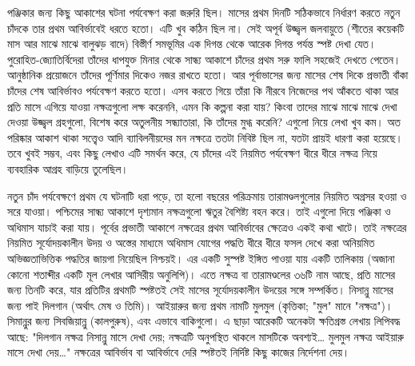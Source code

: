 পঞ্জিকার জন্য কিছু আকাশের ঘটনা পর্যবেক্ষণ করা জরুরি ছিল। মাসের প্রথম দিনটি সঠিকভাবে নির্ধারণ করতে নতুন চাঁদকে তার প্রথম আবির্ভাবেই ধরতে হতো। এটি খুব কঠিন ছিল না। সেই অপূর্ব উজ্জ্বল জলবায়ুতে (শীতের কয়েকটি মাস আর মাঝে মাঝে বালুঝড় বাদে) বিস্তীর্ণ সমভূমির এক দিগন্ত থেকে আরেক দিগন্ত পর্যন্ত স্পষ্ট দেখা যেত। পুরোহিত-জ্যোতির্বিদেরা তাঁদের ধাপযুক্ত মিনার থেকে সান্ধ্য আকাশে চাঁদের প্রথম সরু ফালি সহজেই দেখতে পেতেন। আনুষ্ঠানিক প্রয়োজনে তাঁদের পূর্ণিমার দিকেও নজর রাখতে হতো। আর পূর্বাভাসের জন্য মাসের শেষ দিকে প্রভাতী বাঁকা চাঁদের শেষ আবির্ভাবও পর্যবেক্ষণ করতে হতো। এসব করতে গিয়ে তাঁরা কি নীরবে নিজেদের পথ আঁকতে থাকা আর প্রতি মাসে এগিয়ে যাওয়া নক্ষত্রগুলো লক্ষ করেননি, এমন কি কল্পনা করা যায়? কিংবা তাদের মাঝে মাঝে মাঝে দেখা দেওয়া উজ্জ্বল গ্রহগুলো, বিশেষ করে অতুলনীয় সন্ধ্যাতারা, কি তাঁদের মুগ্ধ করেনি? এগুলো নিয়ে লেখা খুব কম। অত পরিষ্কার আকাশ থাকা সত্ত্বেও আদি ব্যাবিলনীয়দের মন নক্ষত্রে ততটা নিবিষ্ট ছিল না, যতটা প্রায়ই ধারণা করা হয়েছে। তবে খুবই সম্ভব, এবং কিছু লেখাও এটি সমর্থন করে, যে চাঁদের এই নিয়মিত পর্যবেক্ষণ ধীরে ধীরে নক্ষত্র নিয়ে ব্যবহারিক আগ্রহ বাড়িয়ে তুলেছিল।

নতুন চাঁদ পর্যবেক্ষণে প্রথম যে ঘটনাটি ধরা পড়ে, তা হলো বছরের পরিক্রমায় তারামণ্ডলগুলোর নিয়মিত অগ্রসর হওয়া ও সরে যাওয়া। পশ্চিমের সান্ধ্য আকাশে দৃশ্যমান নক্ষত্রগুলো ঋতুর বৈশিষ্ট্য বহন করে। তাই এগুলো দিয়ে পঞ্জিকা ও অধিমাস যাচাই করা যায়। পূর্বের প্রভাতী আকাশে নক্ষত্রের প্রথম আবির্ভাবের ক্ষেত্রেও একই কথা খাটে। তাই নক্ষত্রের নিয়মিত সূর্যোদয়কালীন উদয় ও অস্তের মাধ্যমে অধিমাস যোগের পদ্ধতি ধীরে ধীরে ফসল দেখে করা অনিয়মিত অভিজ্ঞতাভিত্তিক পদ্ধতির জায়গা নিয়েছিল নিশ্চয়ই। এর একটি সুস্পষ্ট ইঙ্গিত পাওয়া যায় একটি তালিকায় (অজানা কোনো শতাব্দীর একটি মূল লেখার আসিরীয় অনুলিপি)। এতে নক্ষত্র বা তারামণ্ডলের ৩৬টি নাম আছে, প্রতি মাসের জন্য তিনটি করে, যার প্রতিটির প্রথমটি স্পষ্টতই সেই মাসের সূর্যোদয়কালীন উদয়ের সঙ্গে সম্পর্কিত। নিসান্নু মাসের জন্য পাই দিলগান (অর্থাৎ মেষ ও তিমি)। আইয়ারুর জন্য প্রথম নামটি মুলমুল (কৃত্তিকা; "মুল" মানে "নক্ষত্র")। সিমান্নুর জন্য সিবজিয়ান্নু (কালপুরুষ), এবং এভাবে বাকিগুলো। এ ছাড়া আরেকটি অনেকটা ক্ষতিগ্রস্ত লেখায় লিপিবদ্ধ আছে: "দিলগান নক্ষত্র নিসান্নু মাসে দেখা দেয়; নক্ষত্রটি অনুপস্থিত থাকলে মাসটিকে অবশ্যই… মুলমুল নক্ষত্র আইয়ারু মাসে দেখা দেয়…" নক্ষত্রের আবির্ভাব বা আবির্ভাবে দেরি স্পষ্টতই নির্দিষ্ট কিছু কাজের নির্দেশনা দেয়।

